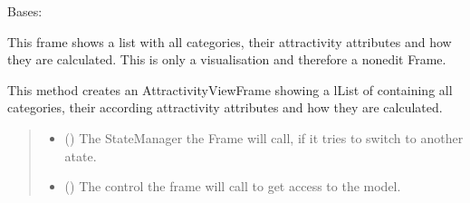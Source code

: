 \documentclass[letterpaper,10pt,english]{sphinxmanual}
\begin{document}
\begin{fulllineitems}
\label{\detokenize{apidoc/src.osm_configurator.view.toplevelframes:src.osm_configurator.view.toplevelframes.attractivity_view_frame.AttractivityViewFrame}}
\pysigstartsignatures
{}
\pysigstopsignatures
\sphinxAtStartPar
Bases: {\hyperref[\detokenize{apidoc/src.osm_configurator.view.toplevelframes:src.osm_configurator.view.toplevelframes.top_level_frame.TopLevelFrame}]{}}

\sphinxAtStartPar
This frame shows a list with all categories, their attractivity attributes and how they are calculated.
This is only a visualisation and therefore a non\sphinxhyphen{}edit Frame.

\begin{fulllineitems}
\label{\detokenize{apidoc/src.osm_configurator.view.toplevelframes:src.osm_configurator.view.toplevelframes.attractivity_view_frame.AttractivityViewFrame.__init__}}
\pysigstartsignatures
{}
\pysigstopsignatures
\sphinxAtStartPar
This method creates an AttractivityViewFrame showing a lList of containing all categories,
their according attractivity attributes and how they are calculated.
\begin{quote}\begin{description}
\begin{itemize}
\item {} 
\sphinxAtStartPar
{} ({\hyperref[\detokenize{apidoc/src.osm_configurator.view.states:src.osm_configurator.view.states.state_manager.StateManager}]{}}) \textendash{} The StateManager the Frame will call, if it tries to switch to another atate.

\item {} 
\sphinxAtStartPar
{} ({\hyperref[\detokenize{apidoc/src.osm_configurator.control:src.osm_configurator.control.control_interface.IControl}]{}}) \textendash{} The control the frame will call to get access to the model.


\end{itemize}
\end{description}
\end{quote}
\end{fulllineitems}
\end{fulllineitems}
\end{document}
